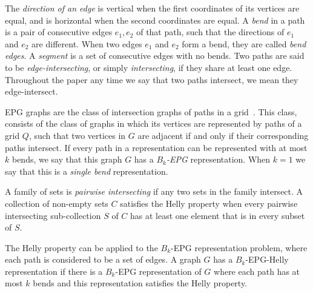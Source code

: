 \documentclass[runningheads]{llncs}
\begin{document}
 
 
 
 
The \emph{direction of an edge} is vertical when the first coordinates of its vertices  are equal, and is horizontal when the second coordinates are equal. A \emph {bend} in a path is a pair of consecutive edges $ e_1, e_2 $ of that path, such that the directions of $ e_1$ and $ e_2$ are different. When two edges $ e_1$ and $e_2 $ form a bend, they are called \emph { bend edges}. A \emph {segment} is a set of consecutive edges with no bends. %
 Two paths are said to be \emph{edge-intersecting}, or  simply  \emph{intersecting}, if they share at least one edge. %
 Throughout the paper any time we say that two paths intersect, we mean they edge-intersect.  %

EPG graphs are the class of intersection graphs of paths in a grid~\cite{golumbic2009}. This class,  consists of the class of graphs in which its vertices are represented by paths of a grid $ Q $, such that two vertices in $ G $ are adjacent if and only if their corresponding paths intersect. If every path in a representation can be represented with at most $ k $ bends, we say that this graph $ G $ has a \emph{ $ B_k$-EPG} representation.%
When $ k = 1 $ we say that this is a \emph{single bend} representation.


A family of sets is \emph{pairwise intersecting} if any two sets in the family intersect. A collection of non-empty sets $C$ satisfies the Helly property when every pairwise intersecting sub-collection $S$ of $ C $ has at least one element that is in every subset of $S$.

The Helly property can be applied to the $ B_k $-EPG representation problem, where each path is considered to be a set of edges. A graph $ G $ has a  $ B_k$-EPG-Helly representation if there is a $ B_k $-EPG representation of $G$ where each path has at most $ k $ bends and this representation satisfies the Helly property. %
% 
\end{document}

